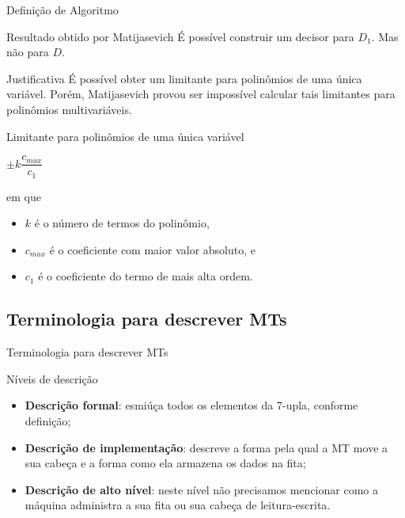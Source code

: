 \documentclass[xcolor=dvipsnames,table]{beamer}
\begin{document}
	\begin{frame}[shrink]{Definição de Algoritmo}
		\begin{block}{Resultado obtido por Matijasevich}
			É possível construir um decisor para $D_1$. Mas não para $D$.
		\end{block}  
		\begin{block}{Justificativa}
			É possível obter um limitante para polinômios de uma única variável. Porém, Matijasevich provou ser impossível calcular tais limitantes para polinômios multivariáveis.
		\end{block} 
		\begin{block}{Limitante para polinômios de uma única variável}
			\begin{center}
				$\pm k \dfrac{c_{max}}{c_1}$
			\end{center}
			em que 
			\begin{itemize}
				\item $k$ é o número de termos do polinômio,
				\item $c_{max}$ é o coeficiente com maior valor absoluto, e
				\item $c_1$ é o coeficiente do termo de mais alta ordem.
			\end{itemize}  
		\end{block}
	\end{frame}

	\subsection{Terminologia para descrever MTs}
	\begin{frame}{Terminologia para descrever MTs}
		\begin{block}{Níveis de descrição}
			\begin{itemize}
				\item {\bf Descrição formal}: esmiúça todos os elementos da 7-upla, conforme definição;
				\item {\bf Descrição de implementação}: descreve a forma pela qual a MT move a sua cabeça e a forma como ela armazena os dados na fita;
				\item {\bf Descrição de alto nível}: neste nível não precisamos mencionar como a máquina administra a sua fita ou sua cabeça de leitura-escrita.
			\end{itemize}
		\end{block}
	\end{frame}
	
\end{document}
